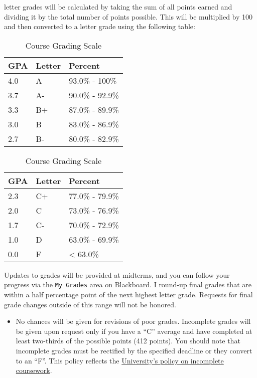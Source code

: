 \documentclass[
]{book}
\newenvironment{rmdblock}[1]
  {\begin{shaded*}
  \begin{itemize}
  \renewcommand{\labelitemi}{
    \raisebox{-.7\height}[0pt][0pt]{
      {\setkeys{Gin}{width=3em,keepaspectratio}\texttt{[image: images/\#1]}}
    }
  }
  \item
  }
  {
  \end{itemize}
  \end{shaded*}
  }
\newenvironment{rmdwarning}
  {\begin{rmdblock}{warning}}
  {\end{rmdblock}}
\begin{document}
letter grades will be calculated by taking the sum of all points earned and dividing it by the total number of points possible. This will be multiplied by 100 and then converted to a letter grade using the following table:

\begin{table}
\caption{\label{tab:unnamed-chunk-11}Course Grading Scale}

\centering
\begin{tabular}[t]{lll}
\toprule
GPA & Letter & Percent\\
\midrule
4.0 & A & 93.0\% - 100\%\\
3.7 & A- & 90.0\% - 92.9\%\\
3.3 & B+ & 87.0\% - 89.9\%\\
3.0 & B & 83.0\% - 86.9\%\\
2.7 & B- & 80.0\% - 82.9\%\\
\bottomrule
\end{tabular}
\centering
\begin{tabular}[t]{lll}
\toprule
GPA & Letter & Percent\\
\midrule
2.3 & C+ & 77.0\% - 79.9\%\\
2.0 & C & 73.0\% - 76.9\%\\
1.7 & C- & 70.0\% - 72.9\%\\
1.0 & D & 63.0\% - 69.9\%\\
0.0 & F & < 63.0\%\\
\bottomrule
\end{tabular}
\end{table}

Updates to grades will be provided at midterms, and you can follow your progress via the \texttt{My\ Grades} area on Blackboard. I round-up final grades that are within a half percentage point of the next highest letter grade. Requests for final grade changes outside of this range will not be honored.

\begin{rmdwarning}
No chances will be given for revisions of poor grades. Incomplete grades
will be given upon request only if you have a ``C'' average and have
completed at least two-thirds of the possible points (412 points). You
should note that incomplete grades must be rectified by the specified
deadline or they convert to an ``F''. This policy reflects the
\href{https://catalog.slu.edu/academic-policies/academic-policies-procedures/incomplete-course/}{University's
policy on incomplete coursework}.
\end{rmdwarning}
\end{document}
